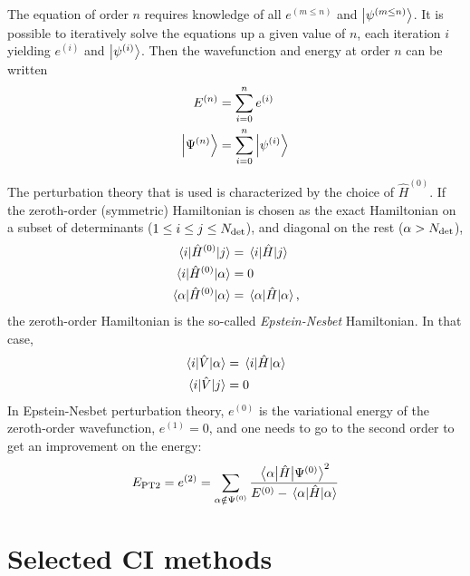 \documentclass[./thesis.tex]{subfiles}
\begin{document}
The equation of order $n$ requires knowledge of all $e^{(m \leq n)}$ and $\ket {\psi^{(m \leq n)}}$. It is possible to iteratively solve the equations up a given value of $n$, each iteration $i$ yielding $e^{(i)}$ and $\ket {\psi^{(i)}}$. Then the wavefunction and energy at order $n$ can be written
\begin{align}
E^{(n)} &=\sum_{i=0}^n e^{(i)} \\
\ket {\Psi^{(n)}} &= \sum_{i=0}^n \ket {\psi^{(i)}}
\end{align}

The perturbation theory that is used is characterized by the choice of $\hat{H}^{(0)}$.
If the zeroth-order (symmetric) Hamiltonian is chosen as the exact Hamiltonian on a subset of determinants ($1 \le i \le j \le {N_\text{det}}$), and diagonal on the rest ($\alpha > {N_\text{det}}$), 
\begin{align}
\mel{i}{\hat{H}^{(0)}}{j} & = \mel{i}{\hat{H}}{j} \\
\mel{i}{\hat{H}^{(0)}}{\alpha} & = 0 \\
\mel{\alpha}{\hat{H}^{(0)}}{\alpha} & = \mel{\alpha}{\hat{H}}{\alpha}, \\
\end{align}
the zeroth-order Hamiltonian is the so-called \emph{Epstein-Nesbet} Hamiltonian. In that case,
\begin{align}
\mel{i}{\hat{V}}{\alpha} & = \mel{i}{\hat{H}}{\alpha} \\
\mel{i}{\hat{V}}{j} & = 0 \\
\end{align}
In Epstein-Nesbet perturbation theory, $e^{(0)}$ is the variational energy of
the zeroth-order wavefunction, $e^{(1)} = 0$, and one needs to go to the second
order to get an improvement on the energy:
\begin{equation}
E_\text{PT2} = e^{(2)} = \sum_{\alpha \notin \Psi^{(0)}} \frac{\mel{\alpha}{\hat{H}}{\Psi^{(0)}}^2}{E^{(0)} - \mel{\alpha}{\hat{H}}{\alpha}}
\end{equation}



\section{Selected CI methods}
\label{sec:meth_cipsi}
\end{document}

